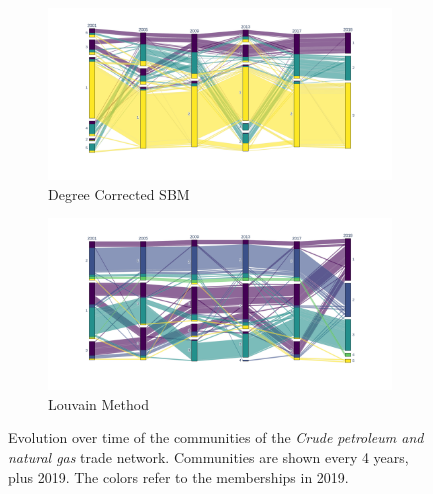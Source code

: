 \begin{figure}
    \centering
    \begin{subfigure}{\textwidth}
        \centering
        \includegraphics[width=\textwidth]{pics/dc_p06.png}
        \caption{Degree Corrected SBM}
        \label{fig:dcgas}
    \end{subfigure}
    \begin{subfigure}{\textwidth}
        \centering
        \includegraphics[width=\textwidth]{pics/lou_p06.png}
        \caption{Louvain Method}
        \label{fig:lougas}
    \end{subfigure}
    \caption[Evolution over time of the communities of the \textit{Crude petroleum and natural gas} trade network.]{Evolution over time of the communities of the \textit{Crude petroleum and natural gas} trade network. Communities are shown every 4 years, plus 2019. The colors refer to the memberships in 2019.}
    \label{fig:commgas}
\end{figure}


